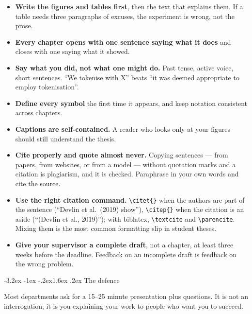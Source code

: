 \documentclass[11pt,a4paper]{article}
\makeatletter
\renewcommand\section{\@startsection{section}{1}{\z@}%
  {-3.2ex \@plus -1ex \@minus -.2ex}{1.6ex \@plus.2ex}%
  {\normalfont\Large\bfseries\color{brand}}}
\newcommand{\code}[1]{\texttt{\small #1}}
\makeatother
\begin{document}
\begin{itemize}
  \item \textbf{Write the figures and tables first}, then the text that
        explains them. If a table needs three paragraphs of excuses, the
        experiment is wrong, not the prose.
  \item \textbf{Every chapter opens with one sentence saying what it does} and
        closes with one saying what it showed.
  \item \textbf{Say what you did, not what one might do.} Past tense, active
        voice, short sentences. ``We tokenise with X'' beats ``it was deemed
        appropriate to employ tokenisation''.
  \item \textbf{Define every symbol} the first time it appears, and keep
        notation consistent across chapters.
  \item \textbf{Captions are self-contained.} A reader who looks only at your
        figures should still understand the thesis.
  \item \textbf{Cite properly and quote almost never.} Copying sentences ---
        from papers, from websites, or from a model --- without quotation
        marks and a citation is plagiarism, and it is checked. Paraphrase in
        your own words and cite the source.
  \item \textbf{Use the right citation command.}
        \code{\textbackslash citet\{\}} when the authors are part of the
        sentence (``Devlin et al.\ (2019) show''),
        \code{\textbackslash citep\{\}} when the citation is an aside
        (``(Devlin et al., 2019)''); with biblatex,
        \code{\textbackslash textcite} and \code{\textbackslash parencite}.
        Mixing them is the most common formatting slip in student theses.
  \item \textbf{Give your supervisor a complete draft}, not a chapter, at
        least three weeks before the deadline. Feedback on an incomplete draft
        is feedback on the wrong problem.
\end{itemize}

\section{The defence}

Most departments ask for a 15--25 minute presentation plus questions. It is not
an interrogation; it is you explaining your work to people who want you to
succeed.
\end{document}
